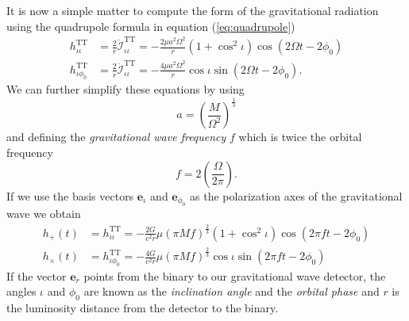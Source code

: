 It is now a simple matter to compute the form of the gravitational
radiation using the quadrupole formula in equation (\ref{eq:quadrupole})
\begin{align}
h_{\iota\iota}^\mathrm{TT} &= 
\frac{2}{r} \ddot{\mathcal{I}}_{\iota\iota}^\mathrm{TT} =
-\frac{2\mu a^2\Omega^2}{r} (1 + \cos^2\iota) \cos\left(2\Omega t - 2\phi_0\right) \\
h_{\iota\phi_0}^\mathrm{TT} &= 
\frac{2}{r} \ddot{\mathcal{I}}_{\iota\iota}^\mathrm{TT} =
-\frac{4 \mu a^2 \Omega^2}{r} \cos\iota \sin\left(2\Omega t - 2\phi_0\right).
\end{align}
We can further simplify these equations by using
\begin{equation}
a = \left(\frac{M}{\Omega^2}\right)^\frac{1}{3}
\end{equation}
and defining the \emph{gravitational wave frequency} $f$ which is twice the
orbital frequency 
\begin{equation}
f  = 2\left(\frac{\Omega}{2\pi}\right).
\end{equation}
If we use the basis vectors $\boldsymbol{e}_{\iota}$ and
$\boldsymbol{e}_{\phi_0}$ as the polarization axes of the gravitational wave
we obtain
\begin{align}
h_{+}(t) &= h_{\iota\iota}^\mathrm{TT} = - \frac{2G}{c^2 r} \mu (\pi M
f)^\frac{2}{3} (1 + \cos^2 \iota ) \cos(2\pi f t - 2 \phi_0) \\
h_{\times}(t) &= h_{\iota\phi_0}^\mathrm{TT} = - \frac{4G}{c^2 r} \mu (\pi M
f)^\frac{2}{3} \cos\iota \sin(2\pi f t - 2 \phi_0)
\end{align}
If the vector $\boldsymbol{e}_r$ points from the binary to our gravitational
wave detector, the angles $\iota$ and $\phi_0$ are known as the
\emph{inclination angle} and the \emph{orbital phase} and $r$ is the
luminosity distance from the detector to the binary.

